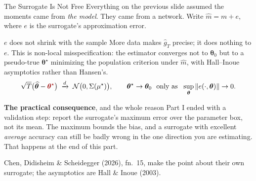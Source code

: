 \documentclass[aspectratio=169,11pt]{beamer}
\newcommand{\emphc}[1]{\textcolor{harvardcrimson}{#1}}
\newcommand{\str}{\bm{\theta}}          %
\begin{document}
\begin{frame}{The Surrogate Is Not Free}
\small
Everything on the previous slide assumed the moments came from \emph{the model}. They came from a network. Write $\widehat m = m + e$, where $e$ is the surrogate's approximation error.

\vspace{0.15cm}
\begin{alertblock}{$e$ does not shrink with the sample}
More data makes $\widehat g_T$ precise; it does nothing to $e$. This is \emphc{non-local misspecification}: the estimator converges not to $\str_0$ but to a \emphc{pseudo-true} $\str^\star$ minimizing the population criterion under $\widehat m$, with Hall--Inoue asymptotics rather than Hansen's.
\vspace{2pt}
\[
\sqrt{T}\bigl(\widehat{\str} - \emphc{\str^\star}\bigr) \;\xrightarrow{d}\; \mathcal{N}\bigl(0, \Sigma(\mu^\star)\bigr),
\qquad \str^\star \to \str_0 \ \text{ only as } \ \sup_{\str} \|e(\cdot,\str)\| \to 0 .
\]
\end{alertblock}

\vspace{0.1cm}
\textbf{The practical consequence}, and the whole reason Part I ended with a validation step: report the surrogate's \emphc{maximum} error over the parameter box, not its mean. The maximum bounds the bias, and a surrogate with excellent \emph{average} accuracy can still be badly wrong in the one direction you are estimating. That happens at the end of this part.

\vspace{0.05cm}
{\footnotesize Chen, Didisheim \& Scheidegger (2026), fn.\ 15, make the point about their own surrogate; the asymptotics are Hall \& Inoue (2003).}
\end{frame}
\end{document}
